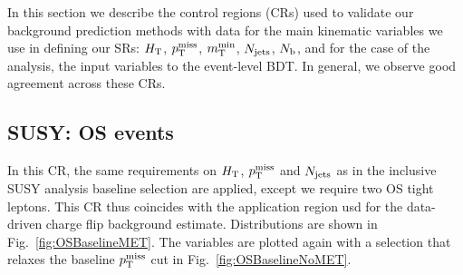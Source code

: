 In this section we describe the control regions (CRs) used to validate our background
prediction methods with data for the main kinematic variables
we use in defining our SRs: $H_{\mathrm{T}}$, $p_{\mathrm{T}}^\text{miss}$, $m_{\mathrm{T}}^{\text{min}}$,
$N_\text{jets}$, $N_\mathrm{b}$, and for the case of the \smft analysis, the input variables
to the event-level BDT. In general, we observe good agreement across these CRs.


\subsection{SUSY: OS events}

In this CR, the same requirements on $H_{\mathrm{T}}$, $p_{\mathrm{T}}^\text{miss}$ and $N_\text{jets}$ as in the
inclusive SUSY analysis baseline selection are applied, except we require two
OS tight leptons. This CR thus coincides with the application region usd for
the data-driven charge flip background estimate. Distributions are shown in
Fig.~\ref{fig:OSBaselineMET}. The variables are plotted again with a
selection that relaxes the baseline $p_{\mathrm{T}}^\text{miss}$ cut in
Fig.~\ref{fig:OSBaselineNoMET}.

